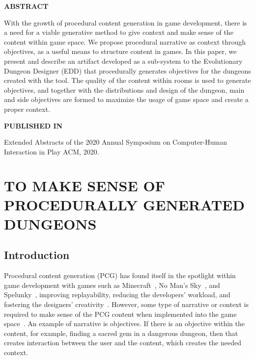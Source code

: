 \graphicspath{{included-papers-tex/paper-6/}}



\normalfont
\textbf{\textsc{ABSTRACT}}

With the growth of procedural content generation in game development, there is a need for a viable generative method to give context and make sense of the content within game space. We propose procedural narrative as context through objectives, as a useful means to structure content in games. In this paper, we present and describe an artifact developed as a sub-system to the Evolutionary Dungeon Designer (EDD) that procedurally generates objectives for the dungeons created with the tool. The quality of the content within rooms is used to generate objectives, and together with the distributions and design of the dungeon, main and side objectives are formed to maximize the usage of game space and create a proper context.

\textbf{\textsc{PUBLISHED IN}}

Extended Abstracts of the 2020 Annual Symposium on Computer-Human Interaction in Play ACM, 2020.

\section*{TO MAKE SENSE OF PROCEDURALLY GENERATED DUNGEONS}

\subsection{Introduction}
Procedural content generation (PCG) has found itself in the spotlight within game development with games such as Minecraft~\cite{p7minecraft}, No Man's Sky~\cite{p7nomansky}, and Spelunky~\cite{p7spelunky}, improving replayability, reducing the developers' workload, and fostering the designers' creativity~\cite{p7shaker2016procedural,hastings_evolving_2009,Alvarez2018}. However, some type of narrative or context is required to make sense of the PCG content when implemented into the game space~\cite{p7ashmore2007}. An example of narrative is objectives. If there is an objective within the content, for example, finding a sacred gem in a dangerous dungeon, then that creates interaction between the user and the content, which creates the needed context.

